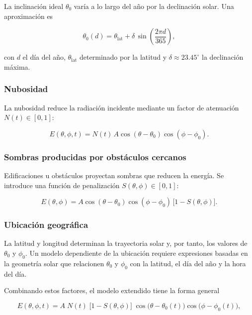 \documentclass[12pt,a4paper]{article}
\begin{document}
La inclinación ideal $\theta_0$ varía a lo largo del año por la declinación solar. Una aproximación es

\begin{equation}\label{eq:ext_estaciones}
\theta_0(d)=\theta_{\text{lat}} + \delta\,\sin\!\left(\frac{2\pi d}{365}\right),
\end{equation}

con $d$ el día del año, $\theta_{\text{lat}}$ determinado por la latitud y $\delta\approx 23.45^\circ$ la declinación máxima.

\subsubsection{Nubosidad}

La nubosidad reduce la radiación incidente mediante un factor de atenuación $N(t)\in[0,1]$:

\begin{equation}\label{eq:ext_nubosidad}
E(\theta,\phi,t)=N(t)\,A\cos(\theta-\theta_0)\cos(\phi-\phi_0).
\end{equation}

\subsubsection{Sombras producidas por obstáculos cercanos}

Edificaciones u obstáculos proyectan sombras que reducen la energía. Se introduce una función de penalización $S(\theta,\phi)\in[0,1]$:

\begin{equation}\label{eq:ext_sombras}
E(\theta,\phi)=A\cos(\theta-\theta_0)\cos(\phi-\phi_0)\,\big[1-S(\theta,\phi)\big].
\end{equation}

\subsubsection{Ubicación geográfica}

La latitud y longitud determinan la trayectoria solar y, por tanto, los valores de $\theta_0$ y $\phi_0$. Un modelo dependiente de la ubicación requiere expresiones basadas en la geometría solar que relacionen $\theta_0$ y $\phi_0$ con la latitud, el día del año y la hora del día.

Combinando estos factores, el modelo extendido tiene la forma general

\begin{equation}\label{eq:ext_integrado}
E(\theta,\phi,t)=A\;N(t)\;\big[1-S(\theta,\phi)\big]\;
\cos\!\big(\theta-\theta_0(t)\big)\cos\!\big(\phi-\phi_0(t)\big),
\end{equation}
\end{document}
